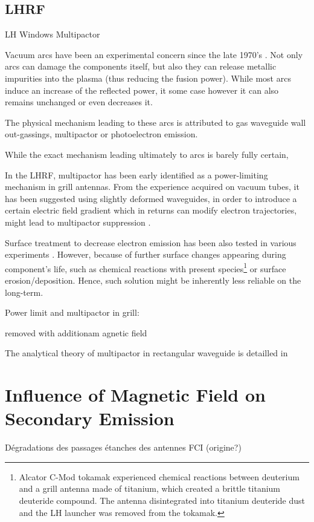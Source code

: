\subsection{LHRF}

LH Windows Multipactor

Vacuum arcs have been an experimental concern since the late 1970's . Not only arcs can damage the components itself, but also they can release metallic impurities into the plasma (thus reducing the fusion power). While most arcs induce an increase of the reflected power, it some case however it can also remains unchanged or even decreases it.

The physical mechanism leading to these arcs is attributed to gas waveguide wall out-gassings, multipactor or photoelectron emission.

While the exact mechanism leading ultimately to arcs is barely fully certain, 

In the LHRF, multipactor has been early identified as a power-limiting mechanism in grill antennas. From the experience acquired on vacuum tubes, it has been suggested using slightly deformed waveguides, in order to introduce a certain electric field gradient which in returns can modify electron trajectories, might lead to multipactor suppression . 

Surface treatment to decrease electron emission has been also tested in various experiments . However, because of further surface changes appearing during component's life, such as chemical reactions with present species\footnote{Alcator C-Mod tokamak experienced chemical reactions between deuterium and a grill antenna made of titanium, which created a brittle titanium deuteride compound. The antenna disintegrated into titanium deuteride dust and the LH launcher was removed from the tokamak\cite{wallace2010}.} or surface erosion/deposition. Hence, such solution might be inherently less reliable on the long-term. 

Power limit and multipactor in grill:\cite{hwang1981, vaughan1982, goniche2012-2, goniche2014} 

removed with additionam agnetic field 
	
	
		


The analytical theory of multipactor in rectangular waveguide is detailled in  


\section{Influence of Magnetic Field on Secondary Emission}





Dégradations des passages étanches des antennes FCI (origine?)








